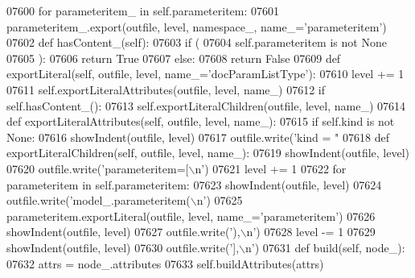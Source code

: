 \begin{DoxyCode}
{{{{{{{{{{{{{{{{{{{{{{{{{{{{{{{{{{{{{{{{{{{{{{{{{{{{{{{{{{{{{{{{{{{{{{{{{{{{{{{{{{{{{{{{{{{{{{{{{{{{{{{{{{{{{{{{{{{{{{{{{{{{{{{{{{{{{{{{{{{{{{{{{{{{{{{{{{{{{{{{{{{{{{{{{{{{{{{{{{{{{{{{{{{{{{{{{{{{{{{{{{{{{{{{{{{{{{{{{{{{{{{{{{{{{{{{{{{{{{{{{{{{{{{{{{{{{{{{{{{{{{{{{{{{{{{{{{{{{{{{{{{{{{{{{{{{{{{{{{{{{{{{{{{{{{{{{{{{{{{{{{{{{{{{{{{{{{{{{{{{{{{{{{{{{{{{{{{{{{{{{{{{{{{{{{{{{{{{{{{{{{{{{{{{{{{{{{{{{{{{{{{{{{{{{{{{{{{{{{{{{{{{{{{{{{{{{{{{{{{{{{{{{{{{{{{{{{{{{{{{{{{{{{{{{{{{{{{{{07600         \textcolor{keywordflow}{for} parameteritem\_ \textcolor{keywordflow}{in} self.parameteritem:
07601             parameteritem\_.export(outfile, level, namespace\_, name\_=\textcolor{stringliteral}{'parameteritem'})
07602     \textcolor{keyword}{def }hasContent_(self):
07603         \textcolor{keywordflow}{if} (
07604             self.parameteritem \textcolor{keywordflow}{is} \textcolor{keywordflow}{not} \textcolor{keywordtype}{None}
07605             ):
07606             \textcolor{keywordflow}{return} \textcolor{keyword}{True}
07607         \textcolor{keywordflow}{else}:
07608             \textcolor{keywordflow}{return} \textcolor{keyword}{False}
07609     \textcolor{keyword}{def }exportLiteral(self, outfile, level, name\_='docParamListType'):
07610         level += 1
07611         self.exportLiteralAttributes(outfile, level, name\_)
07612         \textcolor{keywordflow}{if} self.hasContent_():
07613             self.exportLiteralChildren(outfile, level, name\_)
07614     \textcolor{keyword}{def }exportLiteralAttributes(self, outfile, level, name\_):
07615         \textcolor{keywordflow}{if} self.kind \textcolor{keywordflow}{is} \textcolor{keywordflow}{not} \textcolor{keywordtype}{None}:
07616             showIndent(outfile, level)
07617             outfile.write(\textcolor{stringliteral}{'kind = "%
07618     \textcolor{keyword}{def }exportLiteralChildren(self, outfile, level, name\_):
07619         showIndent(outfile, level)
07620         outfile.write(\textcolor{stringliteral}{'parameteritem=[\(\backslash\)n'})
07621         level += 1
07622         \textcolor{keywordflow}{for} parameteritem \textcolor{keywordflow}{in} self.parameteritem:
07623             showIndent(outfile, level)
07624             outfile.write(\textcolor{stringliteral}{'model\_.parameteritem(\(\backslash\)n'})
07625             parameteritem.exportLiteral(outfile, level, name\_=\textcolor{stringliteral}{'parameteritem'})
07626             showIndent(outfile, level)
07627             outfile.write(\textcolor{stringliteral}{'),\(\backslash\)n'})
07628         level -= 1
07629         showIndent(outfile, level)
07630         outfile.write(\textcolor{stringliteral}{'],\(\backslash\)n'})
07631     \textcolor{keyword}{def }build(self, node\_):
07632         attrs = node\_.attributes
07633         self.buildAttributes(attrs)
}}}}}}}}}}}}}}}}}}}}}}}}}}}}}}}}}}}}}}}}}}}}}}}}}}}}}}}}}}}}}}}}}}}}}}}}}}}}}}}}}}}}}}}}}}}}}}}}}}}}}}}}}}}}}}}}}}}}}}}}}}}}}}}}}}}}}}}}}}}}}}}}}}}}}}}}}}}}}}}}}}}}}}}}}}}}}}}}}}}}}}}}}}}}}}}}}}}}}}}}}}}}}}}}}}}}}}}}}}}}}}}}}}}}}}}}}}}}}}}}}}}}}}}}}}}}}}}}}}}}}}}}}}}}}}}}}}}}}}}}}}}}}}}}}}}}}}}}}}}}}}}}}}}}}}}}}}}}}}}}}}}}}}}}}}}}}}}}}}}}}}}}}}}}}}}}}}}}}}}}}}}}}}}}}}}}}}}}}}}}}}}}}}}}}}}}}}}}}}}}}}}}}}}}}}}}}}}}}}}}}}}}}}}}}}}}}}}}}}}}}}}}}}}}}}}}}}}}}}}}}}}}}}}}}}}}}}}}}}
\end{DoxyCode}
